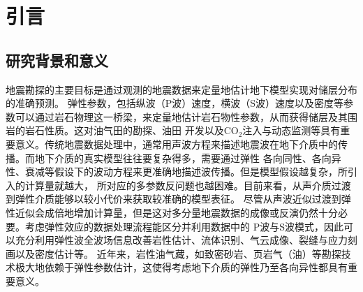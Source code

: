 \chapter{引言}
\section{研究背景和意义}
地震勘探的主要目标是通过观测的地震数据来定量地估计地下模型实现对储层分布的准确预测。
弹性参数，包括纵波（P波）速度，横波（S波）速度以及密度等参数可以通过岩石物理这一桥梁，来定量地估计岩石物性参数，从而获得储层及其围岩的岩石性质。这对油气田的勘探、油田
开发以及CO$_2$注入与动态监测等具有重要意义。传统地震数据处理中，通常用声波方程来描述地震波在地下介质中的传播。而地下介质的真实模型往往要复杂得多，需要通过弹性
各向同性、各向异性、衰减等假设下的波动方程来更准确地描述波传播。但是模型假设越复杂，所引入的计算量就越大，
所对应的多参数反问题也越困难。目前来看，从声介质过渡到弹性介质能够以较小代价来获取较准确的模型表征。
尽管从声波近似过渡到弹性近似会成倍地增加计算量，但是这对多分量地震数据的成像或反演仍然十分必要。考虑弹性效应的数据处理流程能区分并利用数据中的
P波与S波模式，因此可以充分利用弹性波全波场信息改善岩性估计、流体识别、气云成像、裂缝与应力刻画以及密度估计等。
近年来，岩性油气藏，如致密砂岩、页岩气（油）等勘探技术极大地依赖于弹性参数估计，这使得考虑地下介质的弹性乃至各向异性都具有重要意义。

